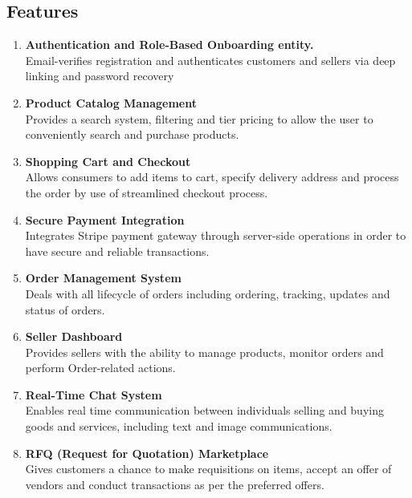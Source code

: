 {\subsection{Features}
\begin{enumerate}

    \item \textbf{Authentication and Role-Based Onboarding entity.} \\
    Email-verifies registration and authenticates customers and sellers via deep linking and password recovery

    \item \textbf{Product Catalog Management} \\
    Provides a search system, filtering and tier pricing to allow the user to conveniently search and purchase products.

    \item \textbf{Shopping Cart and Checkout} \\
    Allows consumers to add items to cart, specify delivery address and process the order by use of streamlined checkout process.

    \item \textbf{Secure Payment Integration} \\
    Integrates Stripe payment gateway through server-side operations in order to have secure and reliable transactions.

    \item \textbf{Order Management System} \\
    Deals with all lifecycle of orders including ordering, tracking, updates and status of orders.
    
    \item \textbf{Seller Dashboard} \\
    Provides sellers with the ability to manage products, monitor orders and perform Order-related actions.

    \item \textbf{Real-Time Chat System} \\
    Enables real time communication between individuals selling and buying goods and services, including text and image communications.

    \item \textbf{RFQ (Request for Quotation) Marketplace} \\
    Gives customers a chance to make requisitions on items, accept an offer of vendors and conduct transactions as per the preferred offers.
    

\end{enumerate}}
